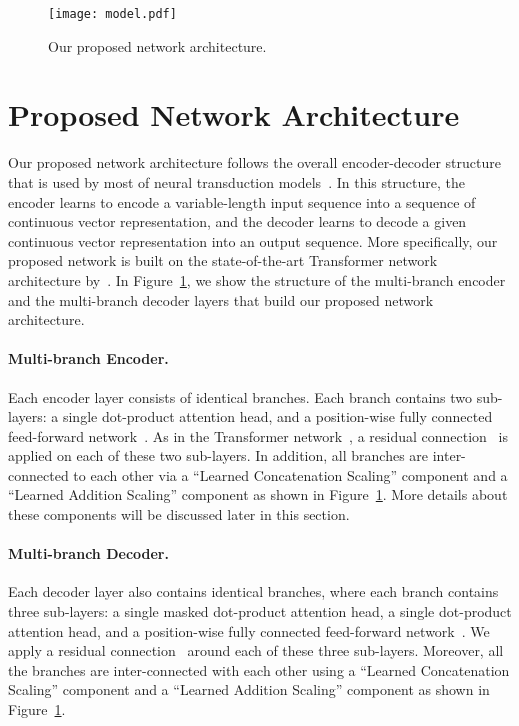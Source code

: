 \documentclass{article} \usepackage{iclr2018_conference,times}
\begin{document}
\begin{figure}
\begin{center}
  \texttt{[image: model.pdf]}
\end{center}
\caption{Our proposed network architecture. \label{fig:model}}
\end{figure}

\section{Proposed Network Architecture}
\iffalse
Our proposed network architecture follows the overall encoder-decoder structure that is used by most of neural transduction models~\citet{cho2014learning,bahdanau2014neural,vaswani2017attention}. In this structure, the encoder learns to encode a variable-length input sequence into a sequence of continuous vector representation, and the decoder learns to decode a given continuous vector representation into an output sequence. More specifically, our proposed network is built on the state-of-the-art Transformer network architecture by~\citep{vaswani2017attention}. In Figure~\ref{fig:model}, we show the structure of the multi-branch encoder and the multi-branch decoder layers that build our proposed network architecture. 


\paragraph{Multi-branch Encoder.} Each encoder layer consists of  identical branches. Each branch contains two sub-layers: a single dot-product attention head, and a position-wise fully connected feed-forward network~\citet{vaswani2017attention}. As in the Transformer network~\citet{vaswani2017attention}, a residual connection~\citep{he2016deep} is applied on each of these two sub-layers.
In addition, all branches are inter-connected to each other via a ``Learned Concatenation Scaling'' component and a ``Learned Addition Scaling'' component as shown in Figure~\ref{fig:model}. More details about these components will be discussed later in this section.


\paragraph{Multi-branch Decoder.} Each decoder layer also contains  identical branches, where each branch contains three sub-layers: a single masked dot-product attention head, a single dot-product attention head, and a position-wise fully connected feed-forward network~\citet{vaswani2017attention}. We apply a residual connection~\citep{he2016deep} around each of these three sub-layers. Moreover, all the branches are inter-connected with each other using a ``Learned Concatenation Scaling'' component and a ``Learned Addition Scaling'' component as shown in Figure~\ref{fig:model}. 
\end{document}
